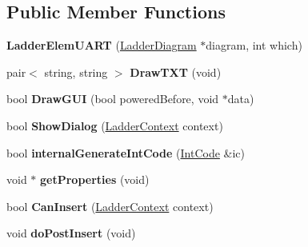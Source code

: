 \subsection*{Public Member Functions}
\begin{DoxyCompactItemize}
\item 
\hypertarget{class_ladder_elem_u_a_r_t_aa90ba6bbbc6389d59e66f63cc44183c2}{{\bfseries Ladder\-Elem\-U\-A\-R\-T} (\hyperlink{class_ladder_diagram}{Ladder\-Diagram} $\ast$diagram, int which)}\label{class_ladder_elem_u_a_r_t_aa90ba6bbbc6389d59e66f63cc44183c2}

\item 
\hypertarget{class_ladder_elem_u_a_r_t_abcd32b88874c7c3afb50dd1acb80934c}{pair$<$ string, string $>$ {\bfseries Draw\-T\-X\-T} (void)}\label{class_ladder_elem_u_a_r_t_abcd32b88874c7c3afb50dd1acb80934c}

\item 
\hypertarget{class_ladder_elem_u_a_r_t_a5f3e5c397e1dbd324b78f7b3dc072f80}{bool {\bfseries Draw\-G\-U\-I} (bool powered\-Before, void $\ast$data)}\label{class_ladder_elem_u_a_r_t_a5f3e5c397e1dbd324b78f7b3dc072f80}

\item 
\hypertarget{class_ladder_elem_u_a_r_t_afda336a46c0c4557af403fbc1a1634cc}{bool {\bfseries Show\-Dialog} (\hyperlink{struct_ladder_context}{Ladder\-Context} context)}\label{class_ladder_elem_u_a_r_t_afda336a46c0c4557af403fbc1a1634cc}

\item 
\hypertarget{class_ladder_elem_u_a_r_t_a87872d941f862cbac3ebb9ea2b73af42}{bool {\bfseries internal\-Generate\-Int\-Code} (\hyperlink{class_int_code}{Int\-Code} \&ic)}\label{class_ladder_elem_u_a_r_t_a87872d941f862cbac3ebb9ea2b73af42}

\item 
\hypertarget{class_ladder_elem_u_a_r_t_a70124ec93c21f7e77f5dd7d1fbaeaf48}{void $\ast$ {\bfseries get\-Properties} (void)}\label{class_ladder_elem_u_a_r_t_a70124ec93c21f7e77f5dd7d1fbaeaf48}

\item 
\hypertarget{class_ladder_elem_u_a_r_t_ab7a81df9cc2177d89e6fa82910e38508}{bool {\bfseries Can\-Insert} (\hyperlink{struct_ladder_context}{Ladder\-Context} context)}\label{class_ladder_elem_u_a_r_t_ab7a81df9cc2177d89e6fa82910e38508}

\item 
\hypertarget{class_ladder_elem_u_a_r_t_a3635e56b3553f825063733705b322b89}{void {\bfseries do\-Post\-Insert} (void)}\label{class_ladder_elem_u_a_r_t_a3635e56b3553f825063733705b322b89}


\end{DoxyCompactItemize}

